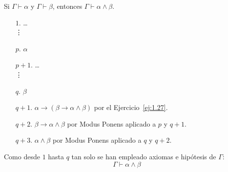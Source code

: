 \begin{ejercicio}\label{ej:1.28}
    Si $\Gamma \vdash \alpha$ y $\Gamma \vdash \beta$, entonces $\Gamma \vdash \alpha \land \beta$.
    \begin{enumerate}
        \item[$1$.] \ldots\\\vdots
        \item[$p$.] $\alpha$
        \item[$p+1$.] \ldots\\\vdots
        \item[$q$.] $\beta$
        \item[$q+1$.] $\alpha\rightarrow (\beta\rightarrow \alpha \land \beta)$ por el Ejercicio~\ref{ej:1.27}.
        \item[$q+2$.] $\beta\rightarrow \alpha \land \beta$ por Modus Ponens aplicado a $p$ y $q+1$.
        \item[$q+3$.] $\alpha \land \beta$ por Modus Ponens aplicado a $q$ y $q+2$.
    \end{enumerate}

    Como desde $1$ hasta $q$ tan solo se han empleado axiomas e hipótesis de $\Gamma$:
    \begin{equation*}
        \Gamma \vdash \alpha\land\beta
    \end{equation*}
\end{ejercicio}
